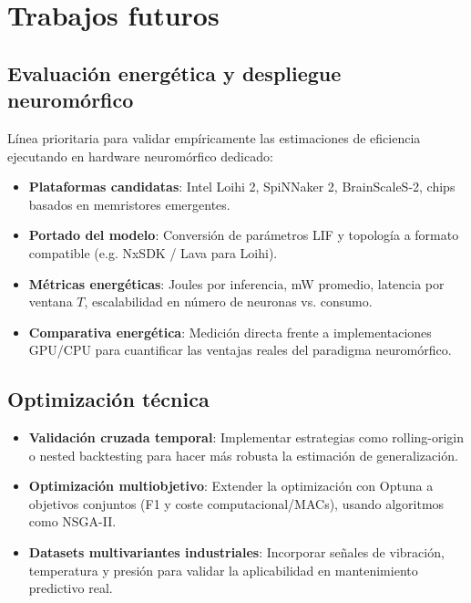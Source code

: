 \section{Trabajos futuros}

\subsection{Evaluación energética y despliegue neuromórfico}
\label{subsec:trabajo-futuro-neuromorfico}
Línea prioritaria para validar empíricamente las estimaciones de eficiencia ejecutando en hardware neuromórfico dedicado:
\begin{itemize}
    \item \textbf{Plataformas candidatas}: Intel Loihi 2, SpiNNaker 2, BrainScaleS-2, chips basados en memristores emergentes.
    \item \textbf{Portado del modelo}: Conversión de parámetros LIF y topología a formato compatible (e.g. NxSDK / Lava para Loihi).
    \item \textbf{Métricas energéticas}: Joules por inferencia, mW promedio, latencia por ventana \(T\), escalabilidad en número de neuronas vs. consumo.
    \item \textbf{Comparativa energética}: Medición directa frente a implementaciones GPU/CPU para cuantificar las ventajas reales del paradigma neuromórfico.
\end{itemize}

\subsection{Optimización técnica}
\begin{itemize}
    \item \textbf{Validación cruzada temporal}: Implementar estrategias como rolling-origin o nested backtesting para hacer más robusta la estimación de generalización.
    \item \textbf{Optimización multiobjetivo}: Extender la optimización con Optuna a objetivos conjuntos (F1 y coste computacional/MACs), usando algoritmos como NSGA-II.
    \item \textbf{Datasets multivariantes industriales}: Incorporar señales de vibración, temperatura y presión para validar la aplicabilidad en mantenimiento predictivo real.
\end{itemize}

